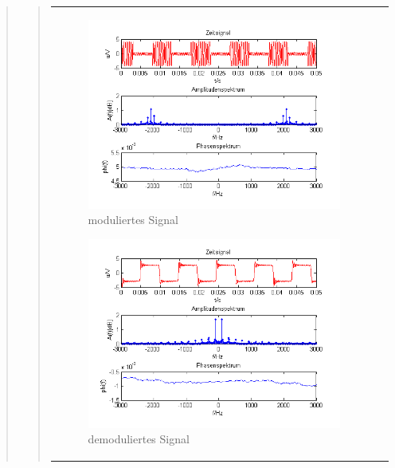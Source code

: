 \begin{quote}
\begin{quote}
\begin{center}
\begin{tabular}{ll}
\begin{minipage}{0.67\textwidth}
                \begin{figure}[H]
                    \label{fig:DemodreieckmT}
                    \includegraphics[scale=0.7]{Bilder/Am_Rec_2k_100Hz_mo}
                    \caption{moduliertes Signal}
                \end{figure}
        
            \end{minipage}
        
            \begin{minipage}{0.67\textwidth}
                \begin{figure}[H]
                    \label{fig:DemodreieckmT2}
                    \includegraphics[scale=0.7]{Bilder/Demo_Rec_2k_100Hz_mo_mitTiefpass}
                    \caption{demoduliertes Signal}
                \end{figure}
        
            \end{minipage}
        
        \end{tabular}
        \end{center}
        
    \end{quote}
    
\end{quote}


